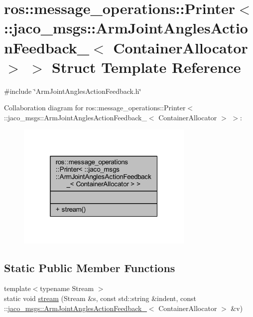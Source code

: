 \hypertarget{structros_1_1message__operations_1_1Printer_3_01_1_1jaco__msgs_1_1ArmJointAnglesActionFeedback__786902009de7467387c5cc1d1cad3c62}{}\section{ros\+:\+:message\+\_\+operations\+:\+:Printer$<$ \+:\+:jaco\+\_\+msgs\+:\+:Arm\+Joint\+Angles\+Action\+Feedback\+\_\+$<$ Container\+Allocator $>$ $>$ Struct Template Reference}
\label{structros_1_1message__operations_1_1Printer_3_01_1_1jaco__msgs_1_1ArmJointAnglesActionFeedback__786902009de7467387c5cc1d1cad3c62}


{\ttfamily \#include \char`\"{}Arm\+Joint\+Angles\+Action\+Feedback.\+h\char`\"{}}



Collaboration diagram for ros\+:\+:message\+\_\+operations\+:\+:Printer$<$ \+:\+:jaco\+\_\+msgs\+:\+:Arm\+Joint\+Angles\+Action\+Feedback\+\_\+$<$ Container\+Allocator $>$ $>$\+:
\nopagebreak
\begin{figure}[H]
\begin{center}
\leavevmode
\includegraphics[width=241pt]{d1/dd0/structros_1_1message__operations_1_1Printer_3_01_1_1jaco__msgs_1_1ArmJointAnglesActionFeedback__dd0decd6a334944c8fe8e490f1a133f2}
\end{center}
\end{figure}
\subsection*{Static Public Member Functions}
\begin{DoxyCompactItemize}
\item 
{\footnotesize template$<$typename Stream $>$ }\\static void \hyperlink{structros_1_1message__operations_1_1Printer_3_01_1_1jaco__msgs_1_1ArmJointAnglesActionFeedback__786902009de7467387c5cc1d1cad3c62_ac02c303b051efc94bf4e0f01715d6482}{stream} (Stream \&s, const std\+::string \&indent, const \+::\hyperlink{structjaco__msgs_1_1ArmJointAnglesActionFeedback__}{jaco\+\_\+msgs\+::\+Arm\+Joint\+Angles\+Action\+Feedback\+\_\+}$<$ Container\+Allocator $>$ \&v)
\end{DoxyCompactItemize}


